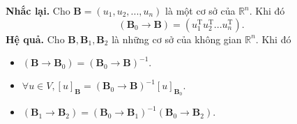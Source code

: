 \textbf{Nhắc lại.} Cho ${\mathbf{B}} = \left( {{u_1},{u_2},...,{u_n}} \right)$ là một cơ sở của $\mathbb{R}^n.$ Khi đó
$$\left( {{\mathbf{B}_0} \to \mathbf{B}} \right) = \left( {u_1^{\mathrm{T}}u_2^{\mathrm{T}}...u_n^{\mathrm{T}}} \right).$$
\textbf{Hệ quả.} Cho $\mathbf{B}, \mathbf{B}_1, \mathbf{B}_2$ là những cơ sở của không gian $\mathbb{R}^n.$ Khi đó
\begin{itemize}
\item $\left( {\mathbf{B} \to {\mathbf{B}_0}} \right) = {\left( {{\mathbf{B}_0} \to \mathbf{B}} \right)^{ - 1}}.$
\item $\forall u \in V,{\left[ u \right]_\mathbf{B}} = {\left( {{\mathbf{B}_0} \to \mathbf{B}} \right)^{ - 1}}{\left[ u \right]_{{\mathbf{B}_0}}}.$
\item $\left( {{\mathbf{B}_1} \to {\mathbf{B}_2}} \right) = {\left( {{\mathbf{B}_0} \to {\mathbf{B}_1}} \right)^{ - 1}}\left( {{\mathbf{B}_0} \to {\mathbf{B}_2}} \right).$
\end{itemize}